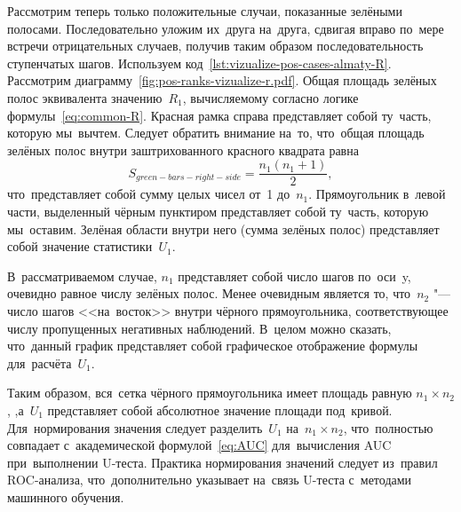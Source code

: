 \documentclass[]{scrreprt}
\begin{document}
Рассмотрим теперь только положительные случаи, показанные зелёными полосами. Последовательно уложим их~друга на~друга, сдвигая вправо по~мере встречи отрицательных случаев, получив таким образом последовательность ступенчатых шагов. Используем код~\ref{lst:vizualize-pos-cases-almaty-R}. Рассмотрим диаграмму~\ref{fig:pos-ranks-vizualize-r.pdf}. Общая площадь зелёных полос эквивалента значению~$R_{1}$, вычисляемому согласно логике формулы~\ref{eq:common-R}.  Красная рамка справа представляет собой ту~часть, которую мы~вычтем. Следует обратить внимание на~то, что~общая площадь зелёных полос внутри заштрихованного красного квадрата равна
\begin{equation}\label{eq:R-1}
S_{green-bars-right-side}=\frac{n_{1}(n_{1}+1)}{2},
\end{equation}
что~представляет собой сумму целых чисел от~1 до~$n_{1}$. Прямоугольник в~левой части, выделенный чёрным пунктиром представляет собой ту~часть, которую мы~оставим. Зелёная области внутри него (сумма зелёных полос) представляет собой значение статистики~$U_{1}$.

В~рассматриваемом случае, $n_{1}$ представляет собой число шагов по~оси~y, очевидно равное числу зелёных полос. Менее очевидным является то, что~$n_{2}$ "--- число шагов <<на~восток>> внутри чёрного прямоугольника, соответствующее числу пропущенных негативных наблюдений. В~целом можно сказать, что~данный график представляет собой графическое отображение формулы для~расчёта~$U_{1}$.

Таким образом, вся~сетка чёрного прямоугольника имеет площадь равную $n_{1} \times n_{2}$, ,а~$U_{1}$ представляет собой абсолютное значение площади под~кривой. Для~нормирования значения следует разделить~$U_{1}$ на~$n_{1} \times n_{2}$, что~полностью совпадает с~академической формулой~\ref{eq:AUC} для~вычисления AUC при~выполнении U-теста. Практика нормирования значений следует из~правил ROC-анализа, что~дополнительно указывает на~связь U-теста с~методами машинного обучения.
\end{document}

